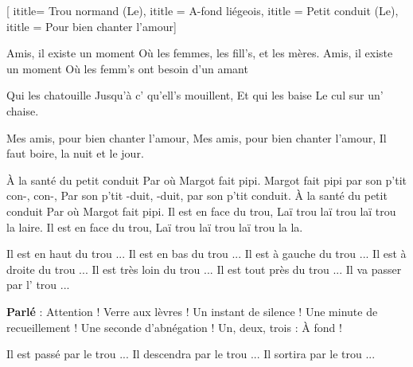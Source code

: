  [
ititle= {Trou normand (Le)},
ititle = {A-fond liégeois},
ititle = {Petit conduit (Le)},
ititle = {Pour bien chanter l'amour}]


\beginverse
Amis, il existe un moment
Où les femmes, les fill's, et les mères.
Amis, il existe un moment
Où les femm's ont besoin d'un amant
\endverse

\beginverse
Qui les chatouille
Jusqu'à c' qu'ell's mouillent,
Et qui les baise
Le cul sur un' chaise.
\endverse

\beginverse
Mes amis, pour bien chanter l'amour,
Mes amis, pour bien chanter l'amour,
Il faut boire, la nuit et le jour.
\endverse

\beginverse
À la santé du petit conduit
Par où Margot fait pipi.
Margot fait pipi par son p'tit con-, con-,
Par son p'tit -duit, -duit, par son p'tit conduit.
À la santé du petit conduit
Par où Margot fait pipi.
Il est en face du trou,
Laï trou laï trou laï trou la laire.
Il est en face du trou,
Laï trou laï trou laï trou la la.
\endverse

\beginverse
Il est en haut du trou ...
Il est en bas du trou ...
Il est à gauche du trou ...
Il est à droite du trou ...
Il est très loin du trou ...
Il est tout près du trou ...
Il va passer par l' trou ...
\endverse

\beginverse
\textbf {Parlé} : Attention ! Verre aux lèvres ! Un instant de silence !
Une minute de recueillement ! Une seconde d'abnégation !
Un, deux, trois : À fond !
\endverse

\beginverse
Il est passé par le trou ...
Il descendra par le trou ...
Il sortira par le trou ...
\endverse

\endsong